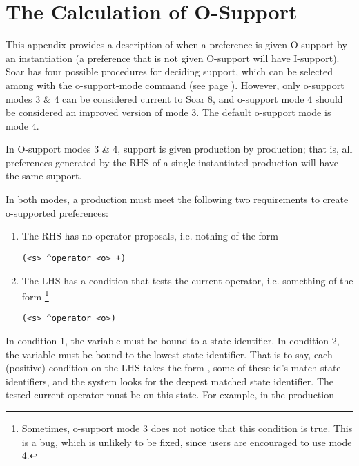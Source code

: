 \chapter{The Calculation of O-Support}
\label{SUPPORT}

This appendix provides a description of when a preference is given O-support by an instantiation (a preference that is not given O-support will have I-support). Soar has four possible procedures for deciding support, which can be selected among with the o-support-mode command (see page \pageref{o-support-mode}). However, only o-support modes 3 \& 4 can be considered current to Soar 8, and o-support mode 4 should be considered an improved version of mode 3.   The default o-support mode is mode 4.

In O-support modes 3 \& 4, support is given production by production; that is, all preferences generated by the RHS of a single instantiated production will have the same support. 


In both modes, a production must meet the following two requirements to create o-supported preferences:
\begin{enumerate}
\item The RHS has no operator proposals, i.e. nothing of the form \begin{verbatim}(<s> ^operator <o> +) \end{verbatim}
\item The LHS has a condition that tests the current operator, i.e. something of the form
\footnote{Sometimes, o-support mode 3 does not notice that this condition is true. This is a bug, which is unlikely to be fixed, since users are encouraged to use mode 4.}
\begin{verbatim}(<s> ^operator <o>)\end{verbatim}
\end{enumerate}



In condition 1, the variable  must be bound to a state identifier.
In condition 2, the variable  must be bound to the lowest state identifier. That is to say, each (positive) condition on the LHS takes the form , some of these id's match state identifiers, and the system looks for the deepest matched state identifier. The tested current operator must be on this state. For example, in the production-

